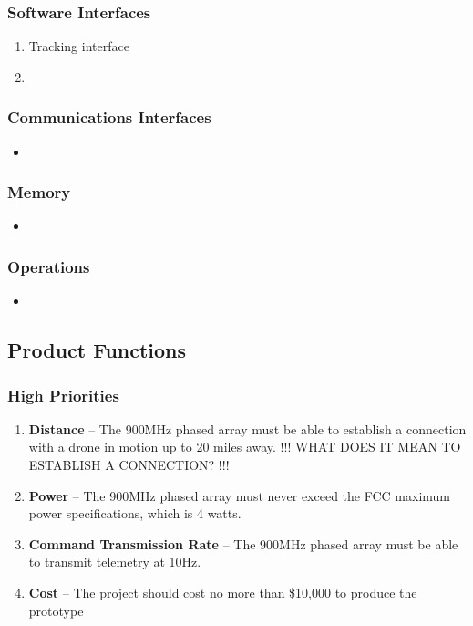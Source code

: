 \documentclass[ProjectRequirements.tex]{subfiles}
\begin{document}
		\subsubsection{Software Interfaces}
			\begin{enumerate}\itemsep1pt
				\item Tracking interface
				\item 
			\end{enumerate}
			
		\subsubsection{Communications Interfaces}
			\begin{itemize}\itemsep1pt
				\item 
			\end{itemize}
			
		\subsubsection{Memory}
			\begin{itemize}\itemsep1pt
				\item 
			\end{itemize}
		
		\subsubsection{Operations}
			\begin{itemize}\itemsep1pt
				\item 
			\end{itemize}
		
	\subsection{Product Functions}
	
		\subsubsection{High Priorities}
			\begin{enumerate}
				\item \textbf{Distance} -- The 900MHz phased array must be able to establish a connection with a drone in motion up to 20 miles away. !!! WHAT DOES IT MEAN TO ESTABLISH A CONNECTION? !!!
				\item \textbf{Power} -- The 900MHz phased array must never exceed the FCC maximum power specifications, which is 4 watts.
				\item \textbf{Command Transmission Rate} -- The 900MHz phased array must be able to transmit telemetry at 10Hz.
				\item \textbf{Cost} -- The project should cost no more than \$10,000 to produce the prototype
							
			\end{enumerate}
		
\end{document}

